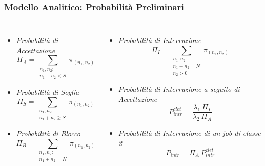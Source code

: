 \begin{frame}
\frametitle{Modello Analitico: Probabilità Preliminari}
\begin{columns}
\begin{itemize}
\item \emph{Probabilità di Accettazione}
\begin{displaymath}
\Pi_A = \sum_{\substack{n_1,n_2:\\n_1 + n_2 < S}} \pi_{(n_1,n_2)}
\end{displaymath}
\item \emph{Probabilità di Soglia}
\begin{displaymath}
\Pi_S = \sum_{\substack{n_1,n_2:\\ n_1 + n_2 \geq S}} \pi_{(n_1,n_2)}
\end{displaymath}
\item \emph{Probabilità di Blocco}
\begin{displaymath}
\Pi_B = \sum_{\substack{n_1,n_2:\\n_1 + n_2 = N}} \pi_{(n_1,n_2)}
\end{displaymath}
\end{itemize}

\begin{itemize}
\item \emph{Probabilità di Interruzione}
\begin{displaymath}
\Pi_I = \sum_{\substack{n_1,n_2:\\n_1 + n_2 = N\\n_2 > 0}} \pi_{(n_1,n_2)}
\end{displaymath}
\item \emph{Probabilità di Interruzione a seguito di Accettazione}
\begin{displaymath}
P_{intr}^{clet} = \frac{\lambda_1 \ \Pi_I}{\lambda_2 \ \Pi_A}
\end{displaymath}
\item \emph{Probabilità di Interruzione di un job di classe 2}
\begin{displaymath} P_{intr} = \Pi_A \ P_{intr}^{clet}
\end{displaymath}
\end{itemize}
\end{columns}
\end{frame}

